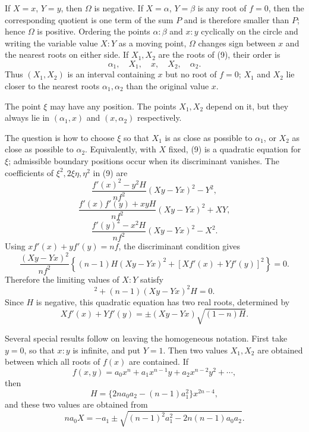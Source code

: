 \documentclass[11pt]{article}
\begin{document}
If $X=x$, $Y=y$, then $\Omega$ is negative. If $X=\alpha$, $Y=\beta$ is any root of $f=0$, then the corresponding quotient is one term of the sum $P$ and is therefore smaller than $P$; hence $\Omega$ is positive. Ordering the points $\alpha:\beta$ and $x:y$ cyclically on the circle and writing the variable value $X:Y$ as a moving point, $\Omega$ changes sign between $x$ and the nearest roots on either side. If $X_1,X_2$ are the roots of (9), their order is
\begin{equation}
        \alpha_1,\quad X_1,\quad x,\quad X_2,\quad \alpha_2.
\tag{10}
\end{equation}
Thus $(X_1,X_2)$ is an interval containing $x$ but no root of $f=0$; $X_1$ and $X_2$ lie closer to the nearest roots $\alpha_1,\alpha_2$ than the original value $x$.

The point $\xi$ may have any position. The points $X_1,X_2$ depend on it, but they always lie in $(\alpha_1,x)$ and $(x,\alpha_2)$ respectively.

The question is how to choose $\xi$ so that $X_1$ is as close as possible to $\alpha_1$, or $X_2$ as close as possible to $\alpha_2$. Equivalently, with $X$ fixed, (9) is a quadratic equation for $\xi$; admissible boundary positions occur when its discriminant vanishes. The coefficients of $\xi^2,2\xi\eta,\eta^2$ in (9) are
\[
\frac{f'(x)^2-y^2H}{n f^2}(Xy-Yx)^2-Y^2,
\]
\[
\frac{f'(x)f'(y)+xyH}{n f^2}(Xy-Yx)^2+XY,
\]
\[
\frac{f'(y)^2-x^2H}{n f^2}(Xy-Yx)^2-X^2.
\]
Using $xf'(x)+yf'(y)=nf$, the discriminant condition gives
\[
        \frac{(Xy-Yx)^2}{n f^2}
        \left\{(n-1)H(Xy-Yx)^2+[Xf'(x)+Yf'(y)]^2\right\}=0.
\]
Therefore the limiting values of $X:Y$ satisfy
\begin{equation}
        [Xf'(x)+Yf'(y)]^2+(n-1)(Xy-Yx)^2H=0.
\tag{11}
\end{equation}
Since $H$ is negative, this quadratic equation has two real roots, determined by
\begin{equation}
        Xf'(x)+Yf'(y)=\pm (Xy-Yx)\sqrt{(1-n)H}.
\tag{12}
\end{equation}

Several special results follow on leaving the homogeneous notation. First take $y=0$, so that $x:y$ is infinite, and put $Y=1$. Then two values $X_1,X_2$ are obtained between which all roots of $f(x)$ are contained. If
\[
        f(x,y)=a_0x^n+a_1x^{n-1}y+a_2x^{n-2}y^2+\cdots,
\]
then
\begin{equation}
        H=\{2na_0a_2-(n-1)a_1^2\}x^{2n-4},
\tag{13}
\end{equation}
and these two values are obtained from
\begin{equation}
        na_0X=-a_1\pm\sqrt{(n-1)^2a_1^2-2n(n-1)a_0a_2}.
\tag{14}
\end{equation}
\end{document}
